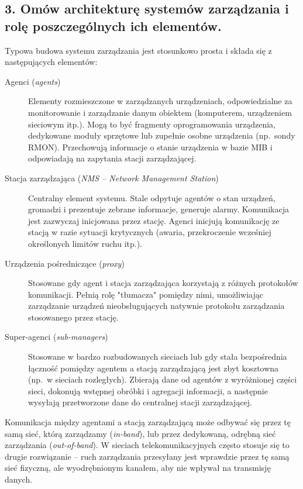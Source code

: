 \documentclass[12pt,a4paper]{article}
\begin{document}
\subsection*{3. Omów architekturę systemów zarządzania i rolę poszczególnych
ich elementów.}

Typowa budowa systemu zarządzania jest stosunkowo prosta i składa się
z następujących elementów:

\begin{description}
  \item[Agenci (\emph{agents})]
        Elementy rozmieszczone w zarządzanych urządzeniach, odpowiedzialne za
        monitorowanie i zarządzanie danym obiektem (komputerem, urządzeniem
        sieciowym itp.). Mogą to być fragmenty oprogramowania urządzenia, dedykowane
        moduły sprzętowe lub zupełnie osobne urządzenia (np.\ sondy RMON).
        Przechowują informacje o stanie urządzenia w bazie MIB i odpowiadają na
        zapytania stacji zarządzającej.
  \item[Stacja zarządzająca (\emph{NMS -- Network Management Station})]
        Centralny element systemu. Stale odpytuje agentów o stan urządzeń,
        gromadzi i prezentuje zebrane informacje, generuje alarmy. Komunikacja
        jest zazwyczaj inicjowana przez stację. Agenci inicjują komunikację
        ze stacją w razie sytuacji krytycznych (awaria, przekroczenie
        wcześniej określonych limitów ruchu itp.).
  \item[Urządzenia pośredniczące (\emph{proxy})]
        Stosowane gdy agent i stacja zarządzająca korzystają z różnych protokołów
        komunikacji. Pełnią rolę "tłumacza" pomiędzy nimi, umożliwiając
        zarządzanie urządzeń nieobsługujących natywnie protokołu zarządzania
        stosowanego przez stację.
  \item[Super-agenci (\emph{sub-managers})]
        Stosowane w bardzo rozbudowanych sieciach lub gdy stała bezpośrednia
        łączność pomiędzy agentem a stacją zarządzającą jest zbyt kosztowna
        (np.\ w sieciach rozległych). Zbierają dane od agentów z wyróżnionej
        części sieci, dokonują wstępnej obróbki i agregacji informacji,
        a następnie wysyłają przetworzone dane do centralnej stacji zarządzającej.
\end{description}

Komunikacja między agentami a stacją zarządzającą może odbywać się przez tę
samą sieć, którą zarządzamy (\emph{in-band}), lub przez dedykowaną, odrębną
sieć zarządzania (\emph{out-of-band}). W sieciach telekomunikacyjnych często
stosuje się to drugie rozwiązanie -- ruch zarządzania przesyłany jest wprawdzie
przez tę samą sieć fizyczną, ale wyodrębnionym kanałem, aby nie wpływał na
transmisję danych.
\end{document}
